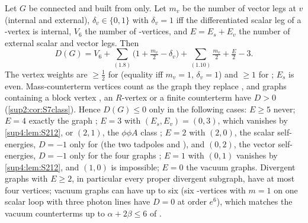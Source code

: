 \begin{lemma}\label{sup4:lem:S211}
Let $G$ be connected and built from \cite[(1.6), (1.8), (1.10)]{Ba3} only. Let $m_v$ be the number of vector legs at $v$ (internal and external), $\delta_v\in\{0,1\}$ with $\delta_v=1$ iff the differentiated scalar leg of a \cite[(1.8)]{Ba3}-vertex is internal, $V_6$ the number of \cite[(1.6)]{Ba3}-vertices, and $E=E_s+E_v$ the number of external scalar and vector legs. Then
\[
D(G)=V_6+\sum_{(1.8)}\big(1+\tfrac{m_v}2-\delta_v\big)+\sum_{(1.10)}\tfrac{m_v}2+\tfrac E2-3 .
\]
The vertex weights are $\ge\frac12$ for \cite[(1.8)]{Ba3} (equality iff $m_v=1$, $\delta_v=1$) and $\ge1$ for \cite[(1.6), (1.10)]{Ba3}; $E_s$ is even. Mass-counterterm vertices count as the graph they replace \cite[(2.3)]{Ba3}, and graphs containing a block vertex \cite[(1.13)--(1.15)]{Ba3}, an $R$-vertex or a finite counterterm have $D>0$ (\cref{sup2:cor:S7class}). Hence $D(G)\le0$ only in the following cases: $E\ge5$ never; $E=4$ exactly the graph \cite[(2.4)]{Ba3}; $E=3$ with $(E_s,E_v)=(0,3)$, which vanishes by \cref{sup4:lem:S212}, or $(2,1)$, the $\phi\phi A$ class \cite[(2.18)--(2.21)]{Ba3}; $E=2$ with $(2,0)$, the scalar self-energies, $D=-1$ only for \cite[(3.6)]{Ba3} (the two tadpoles and \cite[(3.8)]{Ba3}), and $(0,2)$, the vector self-energies, $D=-1$ only for the four graphs \cite[(3.25)]{Ba3}; $E=1$ with $(0,1)$ vanishes by \cref{sup4:lem:S212}, and $(1,0)$ is impossible; $E=0$ the vacuum graphs. Divergent graphs with $E\ge2$, in particular every proper divergent subgraph, have at most four vertices; vacuum graphs can have up to six (six \cite[(1.8)]{Ba3}-vertices with $m=1$ on one scalar loop with three photon lines have $D=0$ at order $e^6$), which matches the vacuum counterterms up to $\alpha+2\beta\le6$ of \cite[p.~418]{Ba3}.
\end{lemma}

